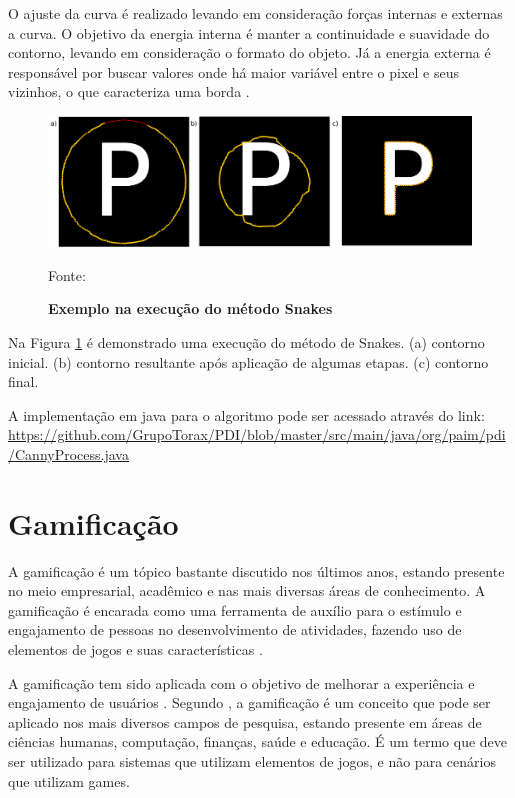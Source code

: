\documentclass[
	12pt,				%
	oneside,			%
	a4paper,			%
	english,			%
	french,				%
	spanish,			%
	brazil,				%
	]{abntex2}
\begin{document}
O ajuste da curva é realizado levando em consideração forças internas e externas a curva. O objetivo da energia interna é manter a continuidade e suavidade do contorno, levando em consideração o formato do objeto. Já a energia externa é responsável por buscar valores onde há maior variável entre o pixel e seus vizinhos, o que caracteriza uma borda \cite{kass:1988}.

\begin{figure}[ht]
\centering
\caption{\textbf{Exemplo na execução do método Snakes}}
\includegraphics[width=1\textwidth]{imagens/snake.png}

Fonte: \citet{pedriniSchwartz:2008}
\label{fig:snake}
\end{figure}

Na Figura \ref{fig:snake} é demonstrado uma execução do método de Snakes. (a) contorno inicial. (b) contorno resultante após aplicação de algumas etapas. (c) contorno final.

A implementação em java para o algoritmo pode ser acessado através do link: \url{https://github.com/GrupoTorax/PDI/blob/master/src/main/java/org/paim/pdi/CannyProcess.java}

\chapter{Gamificação}

A gamificação é um tópico bastante discutido nos últimos anos, estando presente no meio empresarial, acadêmico e nas mais diversas áreas de conhecimento. A gamificação é encarada como uma ferramenta de auxílio para o estímulo e engajamento de pessoas no desenvolvimento de atividades, fazendo uso de elementos de jogos e suas características \cite{quadros2016gamificaccao}.

A gamificação tem sido aplicada com o objetivo de melhorar a experiência e engajamento de usuários \cite{quadros2016gamificaccao}. Segundo \citet{deterding2011game}, a gamificação é um conceito que pode ser aplicado nos mais diversos campos de pesquisa, estando presente em áreas de ciências humanas, computação, finanças, saúde e educação. É um termo que deve ser utilizado para sistemas que utilizam elementos de jogos, e não para cenários que utilizam games. 
\end{document}
